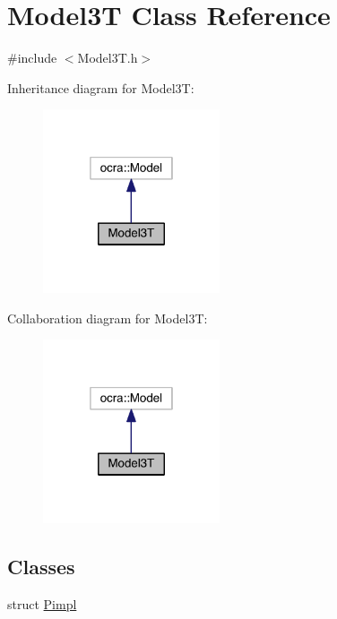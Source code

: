\hypertarget{classModel3T}{}\section{Model3T Class Reference}
\label{classModel3T}


{\ttfamily \#include $<$Model3\+T.\+h$>$}



Inheritance diagram for Model3T\+:\nopagebreak
\begin{figure}[H]
\begin{center}
\leavevmode
\includegraphics[width=148pt]{da/dd6/classModel3T__inherit__graph}
\end{center}
\end{figure}


Collaboration diagram for Model3T\+:\nopagebreak
\begin{figure}[H]
\begin{center}
\leavevmode
\includegraphics[width=148pt]{dd/d8d/classModel3T__coll__graph}
\end{center}
\end{figure}
\subsection*{Classes}
\begin{DoxyCompactItemize}
\item 
struct \hyperlink{structModel3T_1_1Pimpl}{Pimpl}
\end{DoxyCompactItemize}
